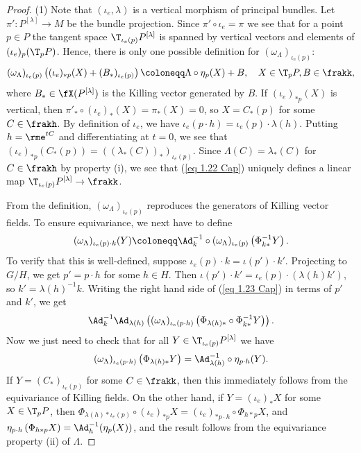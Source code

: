 \begin{proof}
    (1) Note that $(\iota_e,\lambda)$ is a vertical morphism of principal bundles. Let $\pi':P^{[\lambda]}\to M$ be the bundle projection. Since $\pi'\circ \iota_e=\pi$ we see that for a point $p\in P$ the tangent space $\T_{\iota_e(p)}P^{[\lambda]}$ is spanned by vertical vectors and elements of $(\iota_e)_p(\T_p P)$. Hence, there is only one possible definition for $(\omega_\Lambda)_{\iota_e(p)}$:
    \[(\omega_\Lambda)_{\iota_e(p)}\left((\iota_e)_{\ast p}(X)+(B_\ast)_{\iota_e(p)}\right)\coloneqq \Lambda\circ \eta_p (X)+B,\quad X\in \T_p P,B\in\frakk,\label{eq 1.22 Cap}\]
    where $B_\ast\in\fX(P^{[\lambda]})$ is the Killing vector generated by $B$.  If $(\iota_e)_{\ast p}(X)$ is vertical, then $\pi'_\ast\circ (\iota_e)_\ast (X)=\pi_\ast(X)=0$, so $X=C_\ast(p)$ for some $C\in\frakh$. By definition of $\iota_e$, we have $\iota_e(p\cdot h)=\iota_e(p)\cdot \lambda(h)$. Putting $h=\rme^{tC}$ and differentiating at $t=0$, we see that $(\iota_e)_{\ast p}(C_\ast(p))=\left((\lambda_\ast(C))_\ast\right)_{\iota_e(p)}$. Since $\Lambda(C)=\lambda_\ast(C)$ for $C\in\frakh$ by property (i), we see that (\ref{eq 1.22 Cap}) uniquely defines a linear map $\T_{\iota_e(p)}P^{[\lambda]}\to\frakk$.

    From the definition, $(\omega_\Lambda)_{\iota_e(p)}$ reproduces the generators of Killing vector fields. To ensure equivariance, we next have to define 
    \[(\omega_\Lambda)_{\iota_e(p)\cdot k}(Y)\coloneqq \Ad_k^{-1}\circ (\omega_\Lambda)_{\iota_e(p)}\left(\Phi_{k\ast}^{-1} Y\right).\label{eq 1.23 Cap}\]
    To verify that this is well-defined, suppose $\iota_e(p)\cdot k=\iota(p')\cdot k'$. Projecting to $G\slash H$, we get $p'=p\cdot h$ for some $h\in H$. Then $\iota(p')\cdot k'=\iota_e(p)\cdot(\lambda(h)k')$, so $k'=\lambda(h)^{-1}k$. Writing the right hand side of (\ref{eq 1.23 Cap}) in terms of $p'$ and $k'$, we get 
    \[\Ad_k^{-1}\Ad_{\lambda(h)}\left((\omega_\Lambda)_{\iota_e(p\cdot h)}\left(\Phi_{\lambda(h)\ast}\circ \Phi_{k\ast}^{-1}Y\right)\right).\] 
    Now we just need to check that for all $Y\in \T_{\iota_e(p)}P^{[\lambda]}$ we have 
    \[(\omega_\Lambda)_{\iota_e(p\cdot h)}\left(\Phi_{\lambda(h)\ast}Y\right)=\Ad_{\lambda(h)}^{-1}\circ \eta_{p\cdot h}(Y).\]
    If $Y=(C_\ast)_{\iota_e(p)}$ for some $C\in\frakk$, then this immediately follows from the equivariance of Killing fields. On the other hand, if $Y=(\iota_e)_\ast X$ for some $X\in \T_p P$, then $\Phi_{\lambda(h)\ast \iota_e(p)}\circ (\iota_e)_{\ast p}X=(\iota_e)_{\ast p\cdot h}\circ \Phi_{h\ast p}X$, and $\eta_{p\cdot h}\left(\Phi_{h\ast p}X\right)=\Ad_h^{-1}(\eta_p(X))$, and the result follows from the equivariance property (ii) of $\Lambda$.


\end{proof}
